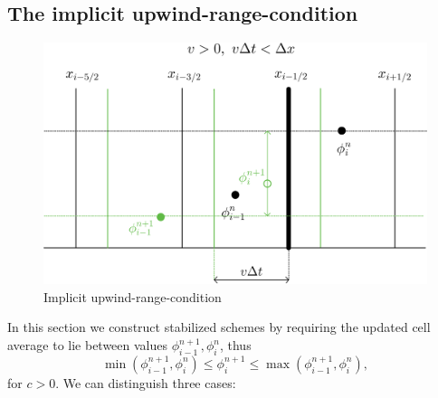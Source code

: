 \documentclass[../thesis.tex]{subfiles}
\begin{document}
\subsection[]{The implicit upwind-range-condition}
\begin{figure}[H]
	\centering
	\includegraphics[width=\textwidth]{Implicit-urc-crop.pdf}
	\caption{Implicit upwind-range-condition}
	\label{fig:implicit-urc}
\end{figure}
In this section we construct stabilized schemes by requiring the updated cell average to lie between values \(\phi_{i-1}^{n+1},\phi_{i}^{n}\), thus
\begin{equation}\label{eqn:implicit-upwind-range-condition}
    \min\left( \phi_{i-1}^{n+1},\phi_{i}^{n} \right)
    \leq
    \phi_{i}^{n+1}
    \leq
    \max\left( \phi_{i-1}^{n+1},\phi_{i}^{n} \right),
\end{equation}
for \(c > 0\). We can distinguish three cases:
\end{document}
